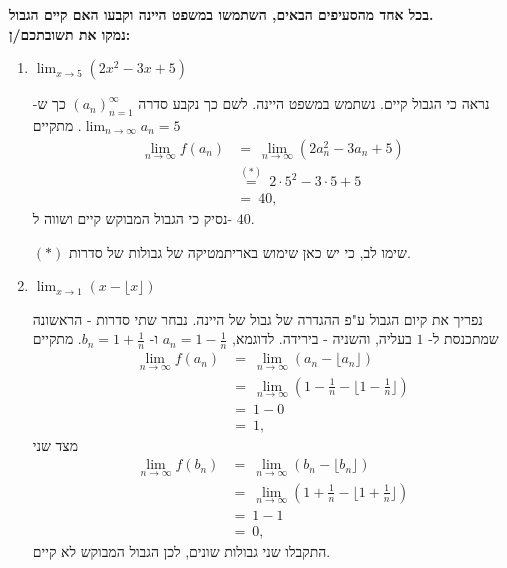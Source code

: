 \textbf{
בכל אחד מהסעיפים הבאים, השתמשו במשפט היינה וקבעו האם קיים הגבול. \\
נמקו את תשובתכם/ן:}

\begin{enumerate}
\item ${\displaystyle\lim_{x\to5}}(2x^2-3x+5)$
\ifsol
\begin{solbox}
נראה כי הגבול קיים. נשתמש במשפט היינה. לשם כך נקבע סדרה
$(a_n)_{n=1}^\infty$
כך ש-
$\displaystyle\lim_{n\to\infty}a_n=5$.
מתקיים
\begin{align*}
    \lim_{n\to\infty}f(a_n)&=\ \lim_{n\to\infty}\left(2a_n^2-3a_n+5\right)\\
    &\overset{(\ast)}{=}\ 2\cdot5^2-3\cdot5+5\\
    &=\ 40,
\end{align*}
נסיק כי הגבול המבוקש קיים ושווה ל-
$40$.

$(\ast)$ שימו לב, כי יש כאן שימוש באריתמטיקה של גבולות של סדרות.
\end{solbox}
\fi

\item ${\displaystyle\lim_{x\to1}}(x-\lfloor x\rfloor)$
\ifsol
{}
\begin{solbox}
נפריך את קיום הגבול ע"פ ההגדרה של גבול של היינה.
נבחר שתי סדרות - הראשונה שמתכנסת ל-
$1$
בעליה, והשניה - בירידה.
לדוגמא,
$a_n=1-\tfrac{1}{n}$
ו-
$b_n=1+\tfrac{1}{n}$.
מתקיים
\begin{align*}
\displaystyle\lim_{n\to\infty}f(a_n)
&=\ \displaystyle\lim_{n\to\infty}(a_n-\lfloor a_n\rfloor)\\
&=\ \displaystyle\lim_{n\to\infty}(1-\tfrac{1}{n}-\lfloor 1-\tfrac{1}{n}\rfloor)\\
&=\ 1-0\\
&=\ 1,
\end{align*}
מצד שני
\begin{align*}
\displaystyle\lim_{n\to\infty}f(b_n)
&=\ \displaystyle\lim_{n\to\infty}(b_n-\lfloor b_n\rfloor)\\
&=\ \displaystyle\lim_{n\to\infty}(1+\tfrac{1}{n}-\lfloor 1+\tfrac{1}{n}\rfloor)\\
&=\ 1-1\\
&=\ 0,
\end{align*}
התקבלו שני גבולות שונים, לכן הגבול המבוקש לא קיים.
\end{solbox}
\fi


\end{enumerate}
